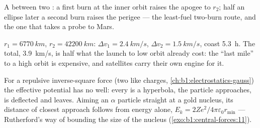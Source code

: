 \begin{omfigure}

{\small A  between two : a first burn at
the inner orbit raises the apogee to $r_2$; half an ellipse later a
second burn raises the perigee --- the least-fuel two-burn route, and
the one that takes a probe to Mars.}
\end{omfigure}

\begin{example}\label{ex:b1:central-forces:leogeo}
$r_1 = \qty{6770}{km}$, $r_2 = \qty{42200}{km}$: $\Delta v_1 = \qty{2.4}{km/s}$,
$\Delta v_2 = \qty{1.5}{km/s}$, coast \qty{5.3}{h}. The total,
\qty{3.9}{km/s}, is half what the launch to low orbit already cost: the
``last mile'' to a high orbit is expensive, and satellites carry their own
engine for it.
\end{example}

\begin{remark}\label{rem:b1:central-forces:rutherford}
For a repulsive inverse-square force (two like charges,
\cref{ch:b1:electrostatics-gauss}) the effective potential has no well:
every  is a hyperbola, the particle approaches, is deflected
and leaves. Aiming an $\alpha$ particle straight at a gold nucleus, its
distance of closest approach follows from energy alone, $E_k =
2Ze^2/4\pi\varepsilon_0 r_{\min}$ --- Rutherford's way of bounding the size of
the nucleus (\cref{exo:b1:central-forces:11}).
\end{remark}

